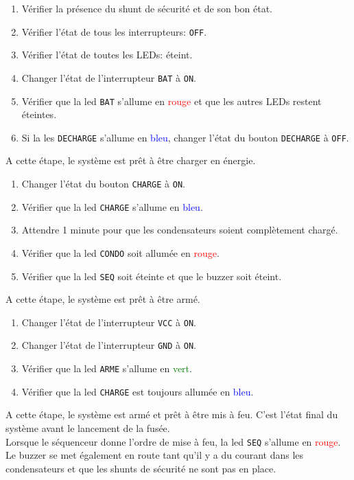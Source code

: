 \begin{enumerate}
    \item Vérifier la présence du shunt de sécurité et de son bon état. 
    \item Vérifier l'état de tous les interrupteurs: \verb|OFF|.
    \item Vérifier l'état de toutes les LEDs: éteint.
    \item Changer l'état de l'interrupteur \verb|BAT| à \verb|ON|.
    \item Vérifier que la led \verb|BAT| s'allume en \textcolor{red}{rouge} et que les autres LEDs restent éteintes.
    \item Si la les \verb|DECHARGE| s'allume en \textcolor{blue}{bleu}, changer l'état du bouton \verb|DECHARGE| à \verb|OFF|.
\end{enumerate}
A cette étape, le système est prêt à être charger en énergie.
\begin{enumerate}[resume]
    \item Changer l'état du bouton \verb|CHARGE| à \verb|ON|.
    \item Vérifier que la led \verb|CHARGE| s'allume en \textcolor{blue}{bleu}.
    \item Attendre 1 minute pour que les condensateurs soient complètement chargé.
    \item Vérifier que la led \verb|CONDO| soit allumée en \textcolor{red}{rouge}.
    \item Vérifier que la led \verb|SEQ| soit éteinte et que le buzzer soit éteint.
\end{enumerate}
A cette étape, le système est prêt à être armé.
\begin{enumerate}[resume]
    \item Changer l'état de l'interrupteur \verb|VCC| à \verb|ON|.
    \item Changer l'état de l'interrupteur \verb|GND| à \verb|ON|.
    \item Vérifier que la led \verb|ARME| s'allume en \textcolor{green}{vert}.
    \item Vérifier que la led \verb|CHARGE| est toujours allumée en \textcolor{blue}{bleu}.
\end{enumerate}
A cette étape, le système est armé et prêt à être mis à feu. C'est l'état final du système avant le lancement de la fusée.\\

Lorsque le séquenceur donne l'ordre de mise à feu, la led \verb|SEQ| s'allume en \textcolor{red}{rouge}. Le buzzer se met
également en route tant qu'il y a du courant dans les condensateurs et que les shunts de sécurité ne sont pas en place.

\newpage
